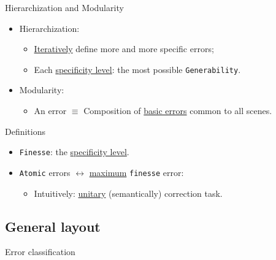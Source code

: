 \documentclass[10pt]{beamer}
\begin{document}
            \begin{frame}{Hierarchization and Modularity}
                \begin{itemize}[label=$\blacktriangleright$, font=\color{IGNGreen}, itemsep=2em]
                    \item<1-> Hierarchization:
                        \begin{itemize}[label=$\blacktriangleright$, font=\color{IGNGreen}, itemsep=2em]
                            \item<2-> \underline{Iteratively} define more and more specific errors;
                            \item<3-> Each \underline{specificity level}: the most possible \texttt{Generability}.
                        \end{itemize}
                    \item<4-> Modularity:
                        \begin{itemize}[label=$\blacktriangleright$, font=\color{IGNGreen}, itemsep=2em]
                            \item<5-> An error \(\equiv\) Composition of \underline{basic errors} common to all scenes.
                        \end{itemize}
                \end{itemize}
            \end{frame}

            \begin{frame}{Definitions}
                \begin{itemize}[label=$\blacktriangleright$, font=\color{IGNGreen}, itemsep=2em]
                    \item<1-> \texttt{Finesse}: the \underline{specificity level}.
                    \item<2-> \texttt{Atomic} errors \(\leftrightarrow\) \underline{maximum} \texttt{finesse} error:
                        \begin{itemize}
                            \item<3-> Intuitively: \underline{unitary} (semantically) correction task.
                        \end{itemize}
                \end{itemize}
            \end{frame}
        
        \subsection{General layout}
            \begin{frame}{Error classification}
                
            \end{frame}
\end{document}
